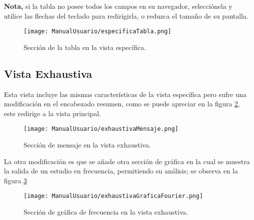 \textbf{Nota,} si la tabla no posee todos los campos en su navegador, selecciónela
y utilice las flechas del teclado para redirigirla, o reduzca el tamaño de su
pantalla.

    \begin{figure}[H]
		\centering
        \caption{Sección de la tabla en la vista específica. }
        \texttt{[image: ManualUsuario/especificaTabla.png]}
        \label{img:especificaTablaManual}
	\end{figure}


\subsection{Vista Exhaustiva}
Esta vista incluye las mismas características de la vista específica pero sufre
una modificación en el encabezado resumen, como se puede apreciar en la figura
\ref{img:exhaustivaMensajeManual},
este redirige a la vista principal.

    \begin{figure}[H]
		\centering
        \caption{Sección de mensaje en la vista exhaustiva. }
        \texttt{[image: ManualUsuario/exhaustivaMensaje.png]}
        \label{img:exhaustivaMensajeManual}
	\end{figure}



La otra modificación es que se añade otra sección de gráfica en la cual se muestra
la salida de un estudio en frecuencia, permitiendo su análisis; se observa en
la figura \ref{img:exhaustivaGraficaFourierManual}


    \begin{figure}[H]
		\centering
        \caption{Sección de gráfica de frecuencia en la vista exhaustiva. }
        \texttt{[image: ManualUsuario/exhaustivaGraficaFourier.png]}
        \label{img:exhaustivaGraficaFourierManual}
	\end{figure}




